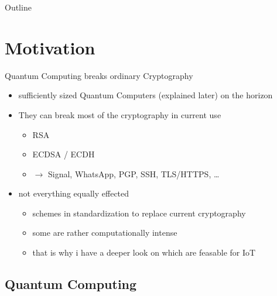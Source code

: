 \documentclass[ucs,10pt]{beamer}
\begin{document}
\begin{frame}[plain]
  \titlepage
\end{frame}

\begin{frame}{Outline}
  \tableofcontents[pausesections]
\end{frame}

\section{Motivation}

\begin{frame}{Quantum Computing breaks ordinary Cryptography}
  \begin{itemize}
  \item
    sufficiently sized Quantum Computers (explained later) on the horizon
  \item
    They can break most of the cryptography in current use
    \begin{itemize}
      \item RSA
      \item ECDSA / ECDH
      \item $\rightarrow$ Signal, WhatsApp, PGP, SSH, TLS/HTTPS, \dots
    \end{itemize}
  \item 
    not everything equally effected
    \begin{itemize}
      \item schemes in standardization to replace current cryptography
      \item some are rather computationally intense
      \item that is why i have a deeper look on which are feasable for IoT
    \end{itemize}
  \end{itemize}
\end{frame}

\subsection{Quantum Computing}
\end{document}
